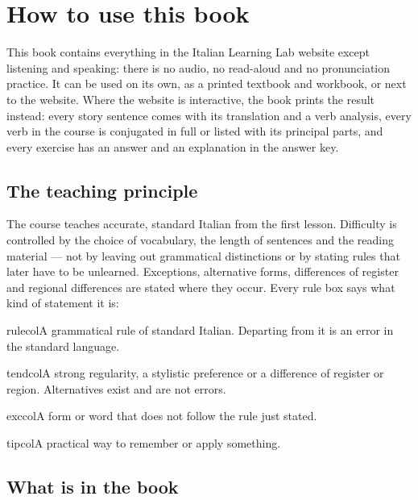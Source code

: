 \chapter{How to use this book}

This book contains everything in the Italian Learning Lab website except listening and speaking: there is no audio, no read-aloud and no pronunciation practice. It can be used on its own, as a printed textbook and workbook, or next to the website. Where the website is interactive, the book prints the result instead: every story sentence comes with its translation and a verb analysis, every verb in the course is conjugated in full or listed with its principal parts, and every exercise has an answer and an explanation in the answer key.

\section*{The teaching principle}

The course teaches accurate, standard Italian from the first lesson. Difficulty is controlled by the choice of vocabulary, the length of sentences and the reading material --- not by leaving out grammatical distinctions or by stating rules that later have to be unlearned. Exceptions, alternative forms, differences of register and regional differences are stated where they occur. Every rule box says what kind of statement it is:

\begin{notebox}{rulecol}A grammatical rule of standard Italian. Departing from it is an error in the standard language.\end{notebox}
\begin{notebox}{tendcol}A strong regularity, a stylistic preference or a difference of register or region. Alternatives exist and are not errors.\end{notebox}
\begin{notebox}{exccol}A form or word that does not follow the rule just stated.\end{notebox}
\begin{notebox}{tipcol}A practical way to remember or apply something.\end{notebox}

\section*{What is in the book}

